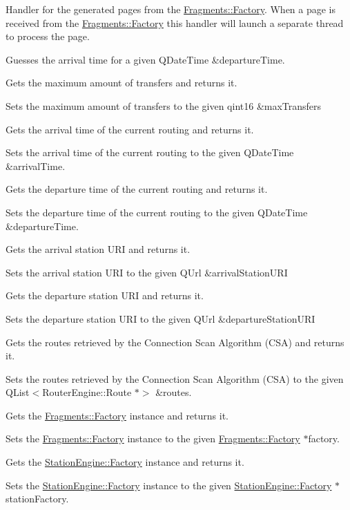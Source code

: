 Handler for the generated pages from the \mbox{\hyperlink{classFragments_1_1Factory}{Fragments\+::\+Factory}}. When a page is received from the \mbox{\hyperlink{classFragments_1_1Factory}{Fragments\+::\+Factory}} this handler will launch a separate thread to process the page.

Guesses the arrival time for a given Q\+Date\+Time \&departure\+Time.

Gets the maximum amount of transfers and returns it.

Sets the maximum amount of transfers to the given qint16 \&max\+Transfers

Gets the arrival time of the current routing and returns it.

Sets the arrival time of the current routing to the given Q\+Date\+Time \&arrival\+Time.

Gets the departure time of the current routing and returns it.

Sets the departure time of the current routing to the given Q\+Date\+Time \&departure\+Time.

Gets the arrival station U\+RI and returns it.

Sets the arrival station U\+RI to the given Q\+Url \&arrival\+Station\+U\+RI

Gets the departure station U\+RI and returns it.

Sets the departure station U\+RI to the given Q\+Url \&departure\+Station\+U\+RI

Gets the routes retrieved by the Connection Scan Algorithm (C\+SA) and returns it.

Sets the routes retrieved by the Connection Scan Algorithm (C\+SA) to the given Q\+List$<$\+Router\+Engine\+::\+Route $\ast$$>$ \&routes.

Gets the \mbox{\hyperlink{classFragments_1_1Factory}{Fragments\+::\+Factory}} instance and returns it.

Sets the \mbox{\hyperlink{classFragments_1_1Factory}{Fragments\+::\+Factory}} instance to the given \mbox{\hyperlink{classFragments_1_1Factory}{Fragments\+::\+Factory}} $\ast$factory.

Gets the \mbox{\hyperlink{classStationEngine_1_1Factory}{Station\+Engine\+::\+Factory}} instance and returns it.

Sets the \mbox{\hyperlink{classStationEngine_1_1Factory}{Station\+Engine\+::\+Factory}} instance to the given \mbox{\hyperlink{classStationEngine_1_1Factory}{Station\+Engine\+::\+Factory}} $\ast$station\+Factory.

